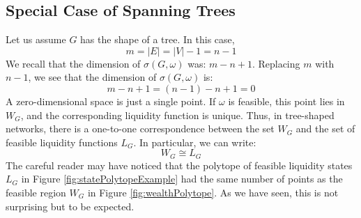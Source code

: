 \documentclass[10pt,twocolumn]{article}
\begin{document}
\subsection{Special Case of Spanning Trees}


Let us assume \(G\) has the shape of a tree. In this case,
\[ m = |E| = |V| - 1 = n - 1 \]
We recall that the dimension of \(\sigma(G, \omega)\) was: \(m - n + 1\). Replacing \(m\) with \(n - 1\), we see that the dimension of \(\sigma(G, \omega)\) is:
\[ m - n + 1 = (n - 1) - n + 1 = 0 \]
A zero-dimensional space is just a single point. If \(\omega\) is feasible, this point lies in \(W_G\), and the corresponding liquidity function is unique. Thus, in tree-shaped networks, there is a one-to-one correspondence between the set \(W_G\) and the set of feasible liquidity functions \(L_G\). In particular, we can write:
\[ W_G \cong L_G \]
The careful reader may have noticed that the polytope of feasible liquidity states \(L_G\) in Figure \ref{fig:statePolytopeExample} had the same number of points as the feasible region \(W_G\) in Figure \ref{fig:wealthPolytope}. As we have seen, this is not surprising but to be expected.
\end{document}
